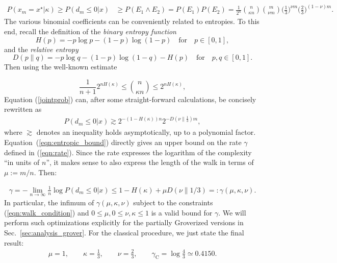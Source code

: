 \documentclass[a4paper,aps,floatfix]{revtex4}
\begin{document}
\begin{align}
    P(x_m=x^\star|\kappa)\ge
    P(d_m\le 0|x) &\ge P(E_1\land E_2) 
    = P(E_1)P(E_2) 
    = \frac{1}{2^n}\binom{n}{\kappa n} \binom{m}{\nu m}\Big(\frac13\Big)^{\nu m}\Big(\frac23\Big)^{(1-\nu)m}.
    \label{jointprob}
\end{align}
The various binomial coefficients can be conveniently related to entropies.
To this end, recall the definition
of the \emph{binary entropy function} 
\begin{equation*}
		H(p) = -p\log p - (1-p) \log(1-p)  \quad \text{for} \quad p \in [0,1],
\end{equation*}
and the \emph{relative entropy}
\begin{equation*}
	 D(p\parallel q) = - p\log q - (1-p)\log(1-q) - H(p)  \quad \text{for} \quad p,q \in [0,1]. 
\end{equation*}
Then using the well-known estimate \cite[Chapter 11.1]{cover}

\begin{equation*}
    \frac{1}{n+1}2^{nH(\kappa)} \le \binom{n}{\kappa n} \le 2^{nH(\kappa)},
\end{equation*}
Equation (\ref{jointprob}) can, after some straight-forward calculations, be concisely rewritten as
\begin{align}\label{eqn:entropic_bound}
    P(d_m\le 0|x) \gtrsim 2^{-(1-H(\kappa))n}2^{-D(\nu \parallel \frac13)m},
\end{align}
where $\gtrsim$ denotes an inequality holds asymptotically, up to a polynomial factor. 
Equation~(\ref{eqn:entropic_bound}) directly gives an upper bound on the rate $\gamma$ defined in (\ref{eqn:rate}). 
Since the rate expresses the logarithm of the complexity ``in units of $n$'', it makes sense to also express the length of the walk in terms of $\mu := m/n$.
Then:

\begin{align}
		\gamma
		= - \lim_{n \rightarrow \infty}\frac1n \log P(d_m\le 0|x)
		\leq
		1- H(\kappa) + \mu D(\nu\parallel 1/3)
		=:
    \gamma(\mu,\kappa,\nu).  \label{gamma}
\end{align}
In particular, the infimum of $\gamma(\mu,\kappa,\nu)$ subject to the constraints (\ref{eqn:walk_condition}) and $0 \leq \mu, 0\leq \nu,\kappa \leq 1$ is a valid bound for $\gamma$.
We will perform such optimizations explicitly for the partially Groverized versions in Sec.~\ref{sec:analysis_grover}.
For the classical procedure, we just state the final result:
\begin{align}\label{eqn:schoening_optimal}
	\mu = 1, \qquad \kappa=\frac13, \qquad \nu=\frac23, \qquad \gamma_{\mathrm{C}} = \log\frac43\simeq 0.4150.
\end{align}
\end{document}
